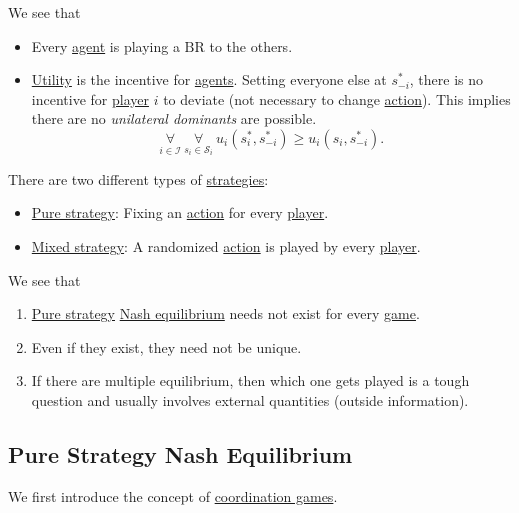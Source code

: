 \begin{note}
	We see that
	\begin{itemize}
		\item Every \hyperref[def:player]{agent} is playing a \(\mathrm{BR}\) to the others.
		\item \hyperref[def:reward]{Utility} is the incentive for \hyperref[def:player]{agents}. Setting everyone else at \(s^{\ast}_{-i}\), there is no
		      incentive for \hyperref[def:player]{player} \(i\) to deviate (not necessary to change \hyperref[def:strategy]{action}). This implies there are no
		      \emph{unilateral dominants} are possible.
		      \[
			      \underset{i\in \mathcal{I}}{\forall}\ \underset{s_{i}\in \mathcal{S}_i}{\forall}\ u_{i}(s^{\ast}_i, s^{\ast}_{-i}) \geq u_{i}(s_{i}, s^{\ast}_{-i}).
		      \]
	\end{itemize}
\end{note}

\begin{prev}
	There are two different types of \hyperref[def:strategy]{strategies}:
	\begin{itemize}
		\item \hyperref[def:pure-strategy]{Pure strategy}: Fixing an \hyperref[def:strategy]{action} for every \hyperref[def:player]{player}.
		\item \hyperref[def:mixed-strategy]{Mixed strategy}: A randomized \hyperref[def:strategy]{action} is played by every \hyperref[def:player]{player}.
	\end{itemize}
\end{prev}

\begin{remark}
	We see that
	\begin{enumerate}
		\item \hyperref[def:pure-strategy]{Pure strategy} \hyperref[def:Nash-equilibrium]{Nash equilibrium} needs not exist for every \hyperref[def:mathematical-game]{game}.
		\item Even if they exist, they need not be unique.
		\item If there are multiple equilibrium, then which one gets played is a tough question and usually involves external quantities (outside information).
	\end{enumerate}
\end{remark}

\subsection{Pure Strategy Nash Equilibrium}
We first introduce the concept of \hyperref[def:coordination-game]{coordination games}.

